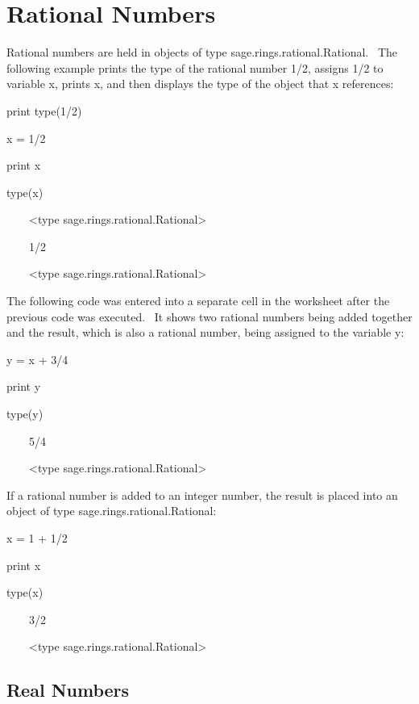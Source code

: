\documentclass[12pt,twoside]{book}
\begin{document}
\section[Rational Numbers]{Rational Numbers}

Rational numbers are held in objects of type sage.rings.rational.Rational. \ The following example prints the type of the rational number 1/2, assigns 1/2 to variable x, prints x, and then displays the type of the object that x references:

print type(1/2)

x = 1/2

print x

type(x)

{\textbar}

\ \ \ \ {\textless}type {\textquotesingle}sage.rings.rational.Rational{\textquotesingle}{\textgreater}

\ \ \ \ 1/2

\ \ \ \ {\textless}type {\textquotesingle}sage.rings.rational.Rational{\textquotesingle}{\textgreater}


\bigskip

The following code was entered into a separate cell in the worksheet after the previous code was executed. \ It shows two rational numbers being added together and the result, which is also a rational number, being assigned to the variable y:

y = x + 3/4

print y

type(y)

{\textbar}

\ \ \ \ 5/4

\ \ \ \ {\textless}type {\textquotesingle}sage.rings.rational.Rational{\textquotesingle}{\textgreater}

If a rational number is added to an integer number, the result is placed into an object of type sage.rings.rational.Rational:


\bigskip

x = 1 + 1/2

print x

type(x)

{\textbar}

\ \ \ \ 3/2

\ \ \ \ {\textless}type {\textquotesingle}sage.rings.rational.Rational{\textquotesingle}{\textgreater}

\subsection[Real Numbers]{Real Numbers}
\end{document}
